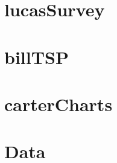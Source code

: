 \documentclass{sig-alternate}
\begin{document}
\section{lucasSurvey}




\section{billTSP}

\section{carterCharts}



\section{Data}
\end{document}
